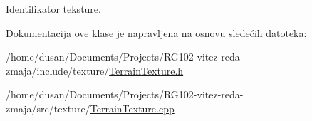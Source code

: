 Identifikator teksture. 



Dokumentacija ove klase je napravljena na osnovu sledećih datoteka\+:\begin{DoxyCompactItemize}
\item 
/home/dusan/\+Documents/\+Projects/\+R\+G102-\/vitez-\/reda-\/zmaja/include/texture/\hyperlink{TerrainTexture_8h}{Terrain\+Texture.\+h}\item 
/home/dusan/\+Documents/\+Projects/\+R\+G102-\/vitez-\/reda-\/zmaja/src/texture/\hyperlink{TerrainTexture_8cpp}{Terrain\+Texture.\+cpp}\end{DoxyCompactItemize}
